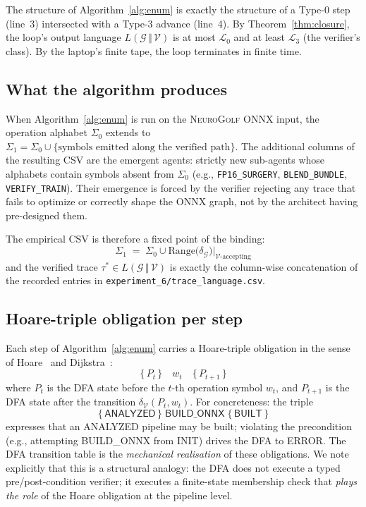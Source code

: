 The structure of Algorithm~\ref{alg:enum} is exactly the structure
of a Type-0 step (line~3) intersected with a Type-3 advance
(line~4).  By Theorem~\ref{thm:closure}, the loop's output
language $L(\mathcal{G}\,\Vert\,\mathcal{V})$ is at most
$\mathcal{L}_0$ and at least $\mathcal{L}_3$ (the verifier's
class).  By the laptop's finite tape, the loop terminates in
finite time.

\subsection{What the algorithm produces}

When Algorithm~\ref{alg:enum} is run on the
\textsc{NeuroGolf ONNX} input, the operation alphabet
$\Sigma_0$ extends to $\Sigma_1 = \Sigma_0\cup\{\text{symbols
emitted along the verified path}\}$.  The additional columns of
the resulting CSV are the emergent agents:
strictly new sub-agents whose alphabets contain symbols absent
from $\Sigma_0$ (e.g.,
\texttt{FP16\_SURGERY}, \texttt{BLEND\_BUNDLE}, \texttt{VERIFY\_TRAIN}).
Their emergence is forced by the verifier rejecting any trace that
fails to optimize or correctly shape the ONNX graph, not by the architect having pre-designed
them.

The empirical CSV is therefore a fixed point of the binding:
\[
\Sigma_1 \;=\;
\Sigma_0 \cup \mathrm{Range}\bigl(\delta_\mathcal{G}\bigr)
\big|_{\mathcal{V}\text{-accepting}}
\]
and the verified trace $\tau^*\in L(\mathcal{G}\,\Vert\,\mathcal{V})$
is exactly the column-wise concatenation of the recorded entries
in \texttt{experiment\_6/trace\_language.csv}.

\subsection{Hoare-triple obligation per step}

Each step of Algorithm~\ref{alg:enum} carries a Hoare-triple
obligation in the sense of
Hoare~\cite{hoare1969axiomatic} and
Dijkstra~\cite{dijkstra1975guarded}:
\[
\{\,P_t\,\}\quad w_t\quad\{\,P_{t+1}\,\}
\]
where $P_t$ is the DFA state before the $t$-th operation symbol
$w_t$, and $P_{t+1}$ is the DFA state after the transition
$\delta_\mathcal{V}(P_t, w_t)$.  For concreteness: the triple
\[
\{\,\textsf{ANALYZED}\,\}\;\textsf{BUILD\_ONNX}\;\{\,\textsf{BUILT}\,\}
\]
expresses that an \textsf{ANALYZED} pipeline may be built;
violating the precondition (e.g., attempting \textsf{BUILD\_ONNX}
from \textsf{INIT}) drives the DFA to \textsf{ERROR}.  The DFA
transition table is the \emph{mechanical realisation} of these
obligations.  We note explicitly that this is a structural analogy:
the DFA does not execute a typed pre/post-condition verifier; it
executes a finite-state membership check that \emph{plays the role}
of the Hoare obligation at the pipeline level.

